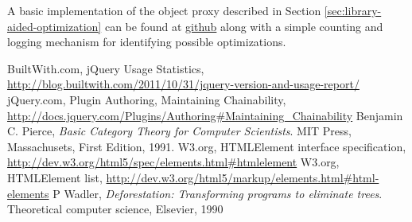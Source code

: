 \documentclass[preprint]{sigplanconf}
\begin{document}
A basic implementation of the object proxy described in Section \ref{sec:library-aided-optimization} can be found at \href{https://github.com/johnbender/jquery-lazy-proxy/blob/79ab61e22547169d6f392512f782df2e29362ebc/lazy.js}{github} along with a simple counting and logging mechanism for identifying possible optimizations.




\begin{thebibliography}{}
\softraggedright

  BuiltWith.com,
  jQuery Usage Statistics,
  \url{http://blog.builtwith.com/2011/10/31/jquery-version-and-usage-report/}
  jQuery.com,
  Plugin Authoring,
  Maintaining Chainability,
  \url{http://docs.jquery.com/Plugins/Authoring#Maintaining_Chainability}
  Benjamin C. Pierce,
  \emph{Basic Category Theory for Computer Scientists}.
  MIT Press, Massachusets,
  First Edition,
  1991.
  W3.org,
  HTMLElement interface specification,
  \url{http://dev.w3.org/html5/spec/elements.html#htmlelement}
  W3.org,
  HTMLElement list,
  \url{http://dev.w3.org/html5/markup/elements.html#html-elements}
  P Wadler,
  \emph{Deforestation: Transforming programs to eliminate trees}.
  Theoretical computer science,
  Elsevier,
  1990

\end{thebibliography}
\end{document}
